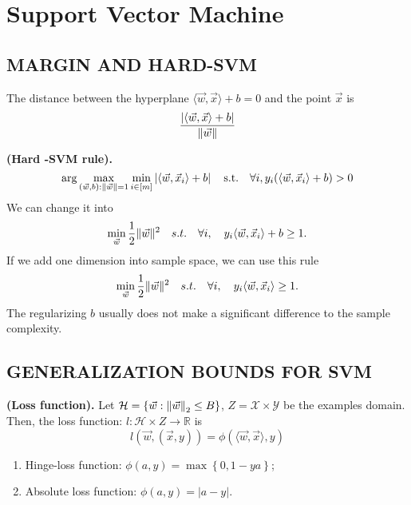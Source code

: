 
\section{Support Vector Machine}%
\label{sec:support_vector_machine}

\subsection{MARGIN AND HARD-SVM}%
\label{sub:margin_and_hard_svm}

\begin{claim}
    The distance between the hyperplane $ \langle \vec{w} , \vec{x} \rangle + b = 0 $ and the point $ \vec{x} $ is
    \[
        \frac{ \left| \langle \vec{w}, \vec{x} \rangle + b\right|}{ \Arrowvert \vec{w} \Arrowvert } 
    \]
\end{claim}

\begin{definition}
    \textbf{(Hard -SVM rule).}
    \[
        \arg\max_{ (\vec{w}, b): \Arrowvert \vec{w} \Arrowvert = 1 } \min_{i \in [m]} \left| \langle \vec{w}, \vec{x}_i \rangle + b \right| \quad \text{s.t.}\quad \forall i, y_i ( \langle \vec{w} , \vec{x}_i \rangle + b) > 0
    \]
    We can change it into
    \[
        \min_{ \vec{w} } \frac{1}{2} \Arrowvert \vec{w}  \Arrowvert^2 \quad s.t.\quad \forall i,\quad y_i \langle \vec{w}, \vec{x}_i \rangle + b \ge 1.
    \]
    If we add one dimension into sample space, we can use this rule
    \[
        \min_{ \vec{w} } \frac{1}{2} \Arrowvert \vec{w}  \Arrowvert^2 \quad s.t.\quad \forall i,\quad y_i \langle \vec{w}, \vec{x}_i \rangle \ge 1.
    \]
    The regularizing $ b $ usually does not make a significant difference to the sample complexity.
\end{definition}

\subsection{GENERALIZATION BOUNDS FOR SVM}%
\label{sub:generalization_bounds_for_svm}

\begin{definition}
    \textbf{(Loss function).}
    Let $ \mathcal{H} = \left\{ \vec{w} : {\Arrowvert \vec{w}  \Arrowvert}_2 \le B \right\} $, $ Z = \mathcal{X}\times \mathcal{Y} $ be the examples domain. Then, the loss function: $ l : \mathcal{H} \times Z \rightarrow \mathbb{R} $ is
    \begin{equation}
        l( \vec{w} , ( \vec{x} , y) ) = \phi (\langle \vec{w}, \vec{x} \rangle, y)
    \end{equation}
    \begin{enumerate}
        \item Hinge-loss function: $ \phi(a, y) = \max \left\{ 0, 1-ya \right\}$;
        \item Absolute loss function: $ \phi(a, y) = \left| a - y \right| $.
    \end{enumerate}
\end{definition}

